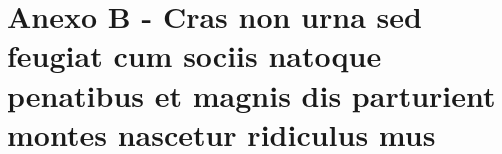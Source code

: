 %
%
%
%
%
\chapter{Anexo B - Cras non urna sed feugiat cum sociis natoque penatibus et magnis dis
	parturient montes nascetur ridiculus mus}

\lipsum[31]